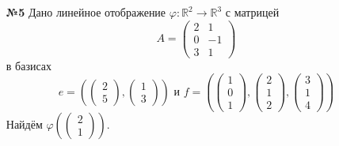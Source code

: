 \documentclass[a4paper]{article}
\begin{document}
\begin{enumerate}
    \item[\textbf{№5}]Дано линейное отображение $\varphi: \mathbb{R}^{2} \rightarrow \mathbb{R}^{3}$ с матрицей 
    $$A=\begin{pmatrix}2 & 1 \\ 0 & -1 \\ 3 & 1\end{pmatrix}$$ 
    в базисах 
    $$e = \left(\begin{pmatrix}2 \\ 5\end{pmatrix}, \begin{pmatrix}1 \\ 3\end{pmatrix}\right) \text{ и }
    f = \left(\begin{pmatrix}1 \\ 0 \\ 1\end{pmatrix}, \begin{pmatrix}2 \\ 1 \\ 2\end{pmatrix}, \begin{pmatrix}3 \\ 1 \\ 4\end{pmatrix}\right)$$
    Найдём $\varphi\left(\begin{pmatrix}2 \\ 1\end{pmatrix}\right)$.


\end{enumerate}
\end{document}
